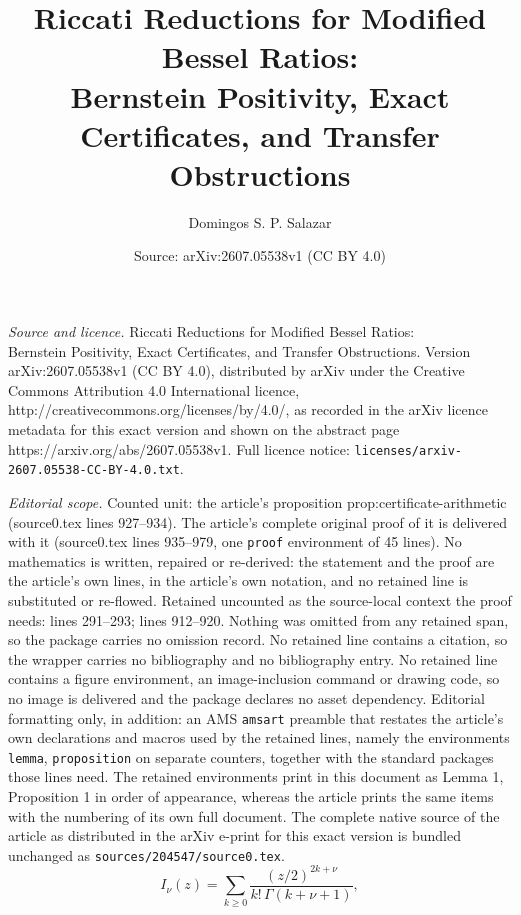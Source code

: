 \documentclass[10pt,a4paper]{amsart}
\title{Riccati Reductions for Modified Bessel Ratios:\\ Bernstein Positivity, Exact Certificates, and Transfer Obstructions}
\author{Domingos S. P. Salazar}
\date{Source: arXiv:2607.05538v1 (CC BY 4.0)}
\begin{document}
\maketitle

\noindent\emph{Source and licence.} Riccati Reductions for Modified Bessel Ratios:\\ Bernstein Positivity, Exact Certificates, and Transfer Obstructions. Version arXiv:2607.05538v1 (CC BY 4.0), distributed by arXiv under the Creative Commons Attribution 4.0 International licence, http://creativecommons.org/licenses/by/4.0/, as recorded in the arXiv licence metadata for this exact version and shown on the abstract page https://arxiv.org/abs/2607.05538v1. Full licence notice: \texttt{licenses/arxiv-2607.05538-CC-BY-4.0.txt}.\par\smallskip

\noindent\textit{Editorial scope.} Counted unit: the article's proposition prop:certificate-arithmetic (source0.tex lines 927--934). The article's complete original proof of it is delivered with it (source0.tex lines 935--979, one \texttt{proof} environment of 45 lines). No mathematics is written, repaired or re-derived: the statement and the proof are the article's own lines, in the article's own notation, and no retained line is substituted or re-flowed.  Retained uncounted as the source-local context the proof needs: lines 291--293; lines 912--920.  Nothing was omitted from any retained span, so the package carries no omission record.  No retained line contains a citation, so the wrapper carries no bibliography and no bibliography entry.  No retained line contains a figure environment, an image-inclusion command or drawing code, so no image is delivered and the package declares no asset dependency.  Editorial formatting only, in addition: an AMS \texttt{amsart} preamble that restates the article's own declarations and macros used by the retained lines, namely the environments \texttt{lemma}, \texttt{proposition} on separate counters, together with the standard packages those lines need.  The retained environments print in this document as Lemma 1, Proposition 1 in order of appearance, whereas the article prints the same items with the numbering of its own full document.  The complete native source of the article as distributed in the arXiv e-print for this exact version is bundled unchanged as \texttt{sources/204547/source0.tex}.
\begin{equation}\label{eq:I-series}
I_\nu(z)=\sum_{k\ge0}\frac{(z/2)^{2k+\nu}}{k!\,\Gamma(k+\nu+1)},
\end{equation}
\end{document}
